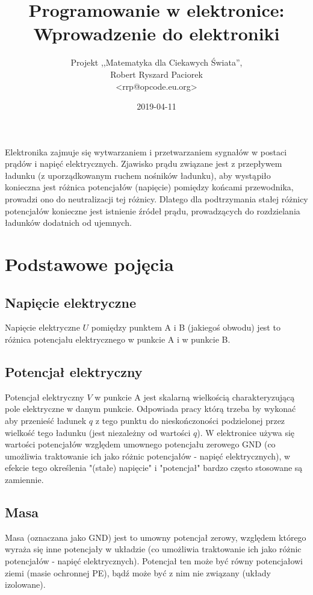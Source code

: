 \documentclass{pdfBooklets}
\title{Programowanie w elektronice: Wprowadzenie do elektroniki}
\author{%
	Projekt ,,Matematyka dla Ciekawych Świata'',\\
	Robert Ryszard Paciorek\\\normalsize\ttfamily <rrp@opcode.eu.org>
}
\date  {2019-04-11}
\begin{document}
\maketitle

Elektronika zajmuje się wytwarzaniem i przetwarzaniem sygnałów w postaci prądów i napięć elektrycznych.
Zjawisko prądu związane jest z przepływem ładunku (z uporządkowanym ruchem nośników ładunku), aby wystąpiło konieczna jest różnica potencjałów (napięcie) pomiędzy końcami przewodnika, prowadzi ono do neutralizacji tej różnicy.
Dlatego dla podtrzymania stałej różnicy potencjałów konieczne jest istnienie źródeł prądu, prowadzących do rozdzielania ładunków dodatnich od ujemnych.

\section{Podstawowe pojęcia}

\subsection{Napięcie elektryczne}
    Napięcie elektryczne $U$ pomiędzy punktem A i B (jakiegoś obwodu)
    jest to różnica potencjału elektrycznego w punkcie A i w punkcie B.
\subsection{Potencjał elektryczny}
    Potencjał elektryczny $V$ w punkcie A
    jest skalarną wielkością charakteryzującą pole elektryczne w danym punkcie. Odpowiada pracy którą trzeba by wykonać aby przenieść ładunek $q$ z tego punktu do nieskończoności podzielonej przez wielkość tego ładunku (jest niezależny od wartości $q$).
    W elektronice używa się wartości potencjałów względem umownego potencjału zerowego GND (co umożliwia traktowanie ich jako różnic potencjałów - napięć elektrycznych), w efekcie tego określenia "(stałe) napięcie" i "potencjał" bardzo często stosowane są zamiennie. 
\subsection{Masa}
   Masa (oznaczana jako GND) jest to
   umowny potencjał zerowy, względem którego wyraża się inne potencjały w układzie (co umożliwia traktowanie ich jako różnic potencjałów - napięć elektrycznych). Potencjał ten może być równy potencjałowi ziemi (masie ochronnej PE), bądź może być z nim nie związany (układy izolowane).
\end{document}
